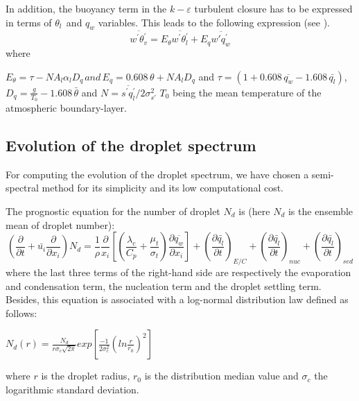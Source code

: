 In addition, the buoyancy term in the $k-\varepsilon $ turbulent closure has
to be expressed in terms of $\theta_{l\, }$ and $ q_{w}$ variables. This
leads to the following expression (see \cite{Bouzereau:2007}).
\begin{equation}
\overline{w^{'}\theta_{v}^{'}}=E_{\theta }\overline{w^{'}\theta
_{l}^{'}}+E_{q}\overline{w'q_{w}^{'}}
\end{equation}
where

\begin{equation}
\end{equation}
$E_{\theta }=\tau -NA_{l}\alpha_{l}D_{q\, }and\, E_{q}=0.608 \, \theta
+NA_{l}D_{q}$ and $\tau =\left( 1+0.608 \, \overline {q_{w}}-1.608 \, \bar{q_{l}}
\right)$,
$D_{q}=\frac{g}{T_{0}}-1.608 \, \bar{\theta }$ and
$N=\overline{s^{'}q_{l}^{'}}/2\sigma_{s'}^{2}$
$T_{0}$ being the mean temperature
of the atmospheric boundary-layer.

\subsection{ Evolution of the droplet spectrum }
For computing the evolution of the droplet spectrum, we have chosen a
semi-spectral method for its simplicity and its low computational cost.

The prognostic equation for the number of droplet $N_{d}$ is (here $N_{d}$ is
the ensemble mean of droplet number):
\begin{equation}
\left( \frac{\partial }{\partial t}+\bar{u_{i}}\frac{\partial }{\partial
x_{i}} \right)N_{d}=\frac{1}{\rho }\frac{\partial }{x_{i}}\left[ \left(
\frac{\lambda_{c}}{C_{p}}+\frac{\mu_{t}}{\sigma_{t}}
\right)\frac{\partial \overline {q_{w}}}{\partial x_{i}} \right]+\left(
\frac{\partial \bar{q_{l}}}{\partial t} \right)_{E/C}+\left( \frac{\partial
\bar{q_{l}}}{\partial t} \right)_{nuc}+\left( \frac{\partial
\bar{q_{l}}}{\partial t} \right)_{sed}
\end{equation}
where the last three terms of the right-hand side are respectively the
evaporation and condensation term, the nucleation term and the droplet
settling term. Besides, this equation is associated with a log-normal
distribution law defined as follows:

$N_{d}\left( r \right)=\frac{N_{d}}{r\sigma_{c}\sqrt {2\pi } }exp\left[
\frac{-1}{2\sigma_{c}^{2}}\left( ln\frac{r}{r_{0}} \right)^{2} \right]$

where $r$ is the droplet radius, $r_{0}$ is the distribution median value and
$\sigma_{c}$ the logarithmic standard deviation.

